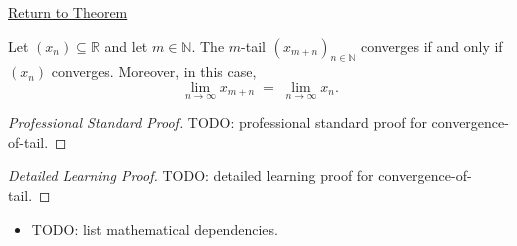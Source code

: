 \newpage
{}
\label{prf:convergence-of-tail}

\begin{remark*}[Return]
\hyperref[thm:convergence-of-tail]{Return to Theorem}
\end{remark*}

\begin{theorem*}
Let $(x_n) \subseteq \mathbb{R}$ and let $m \in \mathbb{N}$. The
$m$-tail $(x_{m+n})_{n \in \mathbb{N}}$ converges if and only if
$(x_n)$ converges. Moreover, in this case,
\[
    \lim_{n \to \infty} x_{m+n} \;=\; \lim_{n \to \infty} x_n.
\]

\smallskip
\noindent
\end{theorem*}

\begin{proof}[Professional Standard Proof]
\LRAProofBodyStart
TODO: professional standard proof for convergence-of-tail.
\end{proof}

\begin{proof}[Detailed Learning Proof]
\LRAProofBodyStart
TODO: detailed learning proof for convergence-of-tail.
\end{proof}

\begin{remark*}
\end{remark*}

\begin{dependencies}
\begin{itemize}
  \item TODO: list mathematical dependencies.
\end{itemize}
\end{dependencies}

\clearpage
